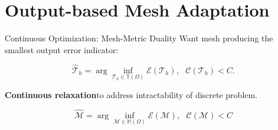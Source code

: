 \documentclass{beamer}
\newcounter{sectionframes}
\newcommand{\setsectionframes}[1]{%
  \setcounter{sectionframes}{#1}%
}
\newcounter{sectionframecount}
\begin{document}
\section{Output-based Mesh Adaptation}

\setsectionframes{3}


\begin{frame}[t]{Continuous Optimization: Mesh-Metric Duality}
\vspace{-10pt}
Want mesh producing the smallest output error indicator:

\begin{equation}
  \hat{\mathcal{T}}_h = \arg \inf_{\mathcal{T}_h \in \mathbb{T}(\Omega)} \mathcal{E}(\mathcal{T}_h),~~~\mathcal{C}(\mathcal{T}_h) < C.
\end{equation}

\textbf{Continuous relaxation}\footnotemark to address intractability of discrete problem.

\begin{equation}
  \hat{\mathcal{M}} = \arg\inf_{\mathcal{M} \in \mathbb{M}(\Omega)} \mathcal{E}(\mathcal{M}),~~~\mathcal{C}(\mathcal{M}) < C
\end{equation}



\end{frame}

\end{document}
